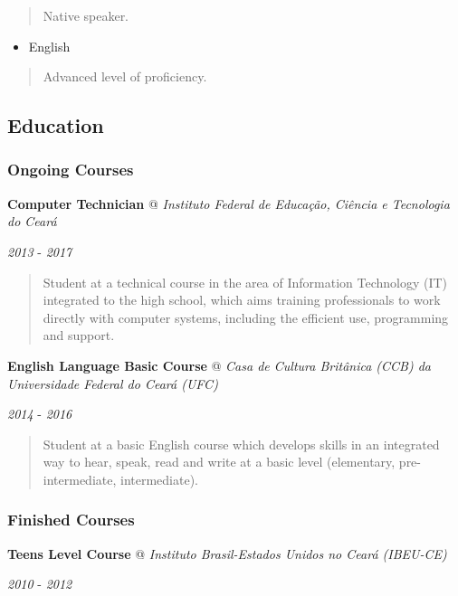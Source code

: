 \documentclass[]{article}
\providecommand{\tightlist}{%
  \setlength{\itemsep}{0pt}\setlength{\parskip}{0pt}}
\begin{document}
\begin{quote}
Native speaker.
\end{quote}

\begin{itemize}
\tightlist
\item
  English
\end{itemize}

\begin{quote}
Advanced level of proficiency.
\end{quote}

\subsection{Education}\label{education}

\subsubsection{Ongoing Courses}\label{ongoing-courses}

\textbf{Computer Technician} @ \emph{Instituto Federal de Educação,
Ciência e Tecnologia do Ceará}

\emph{2013} - \emph{2017}

\begin{quote}
Student at a technical course in the area of Information Technology (IT)
integrated to the high school, which aims training professionals to work
directly with computer systems, including the efficient use, programming
and support.
\end{quote}

\textbf{English Language Basic Course} @ \emph{Casa de Cultura Britânica
(CCB) da Universidade Federal do Ceará (UFC)}

\emph{2014} - \emph{2016}

\begin{quote}
Student at a basic English course which develops skills in an integrated
way to hear, speak, read and write at a basic level (elementary,
pre-intermediate, intermediate).
\end{quote}

\subsubsection{Finished Courses}\label{finished-courses}

\textbf{Teens Level Course} @ \emph{Instituto Brasil-Estados Unidos no
Ceará (IBEU-CE)}

\emph{2010} - \emph{2012}
\end{document}
